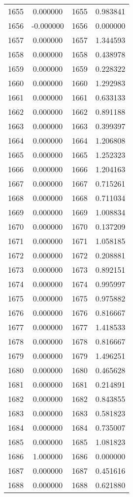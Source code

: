 \documentclass[12pt]{article}
\begin{document}
\begin{longtable}{@{}cccc@{}}
1655 & 0.000000 & 1655 & 0.983841 \\
1656 & -0.000000 & 1656 & 0.000000 \\
1657 & 0.000000 & 1657 & 1.344593 \\
1658 & 0.000000 & 1658 & 0.438978 \\
1659 & 0.000000 & 1659 & 0.228322 \\
1660 & 0.000000 & 1660 & 1.292983 \\
1661 & 0.000000 & 1661 & 0.633133 \\
1662 & 0.000000 & 1662 & 0.891188 \\
1663 & 0.000000 & 1663 & 0.399397 \\
1664 & 0.000000 & 1664 & 1.206808 \\
1665 & 0.000000 & 1665 & 1.252323 \\
1666 & 0.000000 & 1666 & 1.204163 \\
1667 & 0.000000 & 1667 & 0.715261 \\
1668 & 0.000000 & 1668 & 0.711034 \\
1669 & 0.000000 & 1669 & 1.008834 \\
1670 & 0.000000 & 1670 & 0.137209 \\
1671 & 0.000000 & 1671 & 1.058185 \\
1672 & 0.000000 & 1672 & 0.208881 \\
1673 & 0.000000 & 1673 & 0.892151 \\
1674 & 0.000000 & 1674 & 0.995997 \\
1675 & 0.000000 & 1675 & 0.975882 \\
1676 & 0.000000 & 1676 & 0.816667 \\
1677 & 0.000000 & 1677 & 1.418533 \\
1678 & 0.000000 & 1678 & 0.816667 \\
1679 & 0.000000 & 1679 & 1.496251 \\
1680 & 0.000000 & 1680 & 0.465628 \\
1681 & 0.000000 & 1681 & 0.214891 \\
1682 & 0.000000 & 1682 & 0.843855 \\
1683 & 0.000000 & 1683 & 0.581823 \\
1684 & 0.000000 & 1684 & 0.735007 \\
1685 & 0.000000 & 1685 & 1.081823 \\
1686 & 1.000000 & 1686 & 0.000000 \\
1687 & 0.000000 & 1687 & 0.451616 \\
1688 & 0.000000 & 1688 & 0.621880 \\

\end{longtable}
\end{document}
